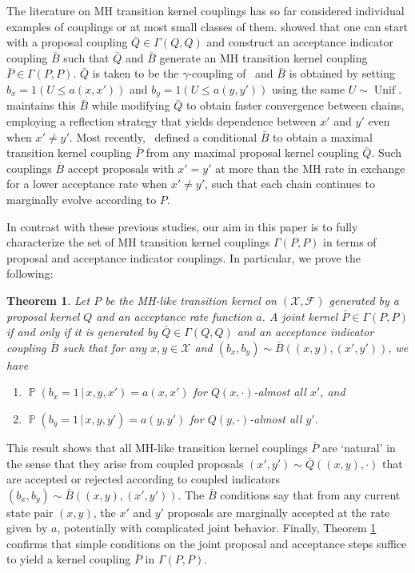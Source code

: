 \documentclass[aihp]{imsart}
\theoremstyle{plain}
\newtheorem{theorem}{Theorem}[section]
\theoremstyle{remark}
\theoremstyle{definition} \newtheorem{example}{Example}
\renewcommand{\P}{\operatorname{\mathbb{P}}}
\newcommand{\Unif}{\operatorname{Unif}}
\newcommand{\scrF}{\mathscr{F}}
\newcommand{\calX}{\mathcal{X}}
\newcommand{\g}{\, | \,}
\newcommand{\bp}{\bar P}
\newcommand{\bq}{\bar Q}
\newcommand{\bb}{\bar B}
\newcommand{\xy}{(x,y)}
\newcommand{\xyp}{(x',y')}
\newcommand{\bxy}{(b_x,b_y)}
\begin{document}
The literature on MH transition kernel couplings has so far considered individual examples of
couplings or at most small classes of them. \citet[section 3.4]{johnson1998coupling} showed that one
can start with a proposal coupling $\bq \in \Gamma(Q,Q)$ and construct an acceptance indicator
coupling $\bb$ such that $\bq$ and $\bb$ generate an MH transition kernel coupling $\bp \in
\Gamma(P,P)$. $\bq$ is taken to be the $\gamma$\nobreakdash-coupling of~\citet{lindvall2002lectures}
and $\bb$ is obtained by setting $b_x = 1(U \leq a(x,x'))$ and $b_y = 1(U \leq a(y,y'))$ using the
same ${U \sim \Unif}$. \citet{Jacob2020} maintains this $\bb$ while modifying $\bq$ to obtain faster
convergence between chains, employing a reflection strategy that yields dependence between $x'$ and
$y'$ even when $x' \neq y'$. Most recently,~\citet{OLeary2020} defined a conditional $\bb$ to obtain
a maximal transition kernel coupling $\bp$ from any maximal proposal kernel coupling $\bq$. Such
couplings $\bb$ accept proposals with $x' = y'$ at more than the MH rate in exchange for a lower
acceptance rate when $x' \neq y'$, such that each chain continues to marginally evolve according to
$P$.

In contrast with these previous studies, our aim in this paper is to fully characterize the set of
MH transition kernel couplings $\Gamma(P,P)$ in terms of proposal and acceptance indicator
couplings. In particular, we prove the following:

\smallskip

\begin{theorem}
\label{thm:repr}
Let $P$ be the MH-like transition kernel on $(\calX, \scrF)$ generated by a
proposal kernel $Q$ and an acceptance rate function $a$. A joint kernel $\bp \in \Gamma(P,P)$ if
and only if it is generated by $\bq \in \Gamma(Q,Q)$ and an acceptance indicator coupling $\bb$
such that for any $x, y \in \calX$ and $\bxy \sim \bb(\xy,\xyp)$, we have
\begin{enumerate}
	\item $\P(b_x=1 \g x,y,x') = a(x,x')$ for $Q(x,\cdot)$-almost all $x'$, and
	\item $\P(b_y=1 \g x,y,y')= a(y,y')$ for $Q(y,\cdot)$-almost all $y'$.
\end{enumerate}
\end{theorem}

This result shows that all MH-like transition kernel couplings $\bp$ are `natural' in the sense that
they arise from coupled proposals $\xyp \sim \bq(\xy, \cdot)$ that are accepted or rejected
according to coupled indicators ${ (b_x, b_y) \sim \bb(\xy, \xyp) }$. The $\bb$ conditions say that
from any current state pair $\xy$, the $x'$ and $y'$ proposals are marginally accepted at the rate
given by $a$, potentially with complicated joint behavior. Finally, Theorem \ref{thm:repr} confirms
that simple conditions on the joint proposal and acceptance steps suffice to yield a kernel coupling
$\bp$ in $\Gamma(P,P)$.
\end{document}

